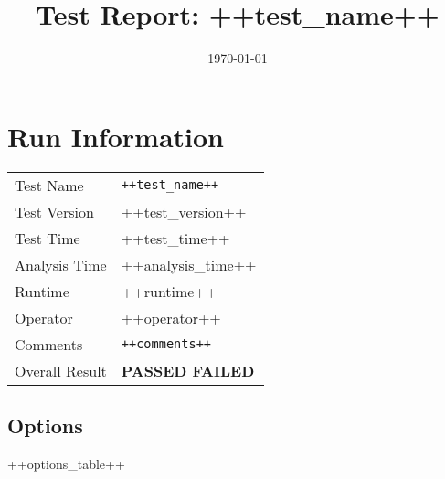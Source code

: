 \documentclass{article}
\title{Test Report: ++test_name++ }
\author{}
\date{\today}
\newcommand{\passed}[1]{%
    \ifboolexpr{ test {\ifnumcomp{#1}{=}{1}}  }
      {PASSED}
      {FAILED}
      }
\begin{document}
\maketitle

\section{Run Information}

\begin{tabular}{p{2.5cm}p{10cm}}
  Test Name      & \texttt{++test_name++}       \\
  Test Version   & ++test_version++             \\
  Test Time      & ++test_time++                \\ 
  Analysis Time  & ++analysis_time++           \\
  Runtime        & ++runtime++                 \\
  Operator       & ++operator++                 \\
  Comments       & \texttt{++comments++}        \\
  Overall Result & \textbf{\passed{++result++}} \\
\end{tabular}

\subsection*{Options}

++options_table++
\end{document}
